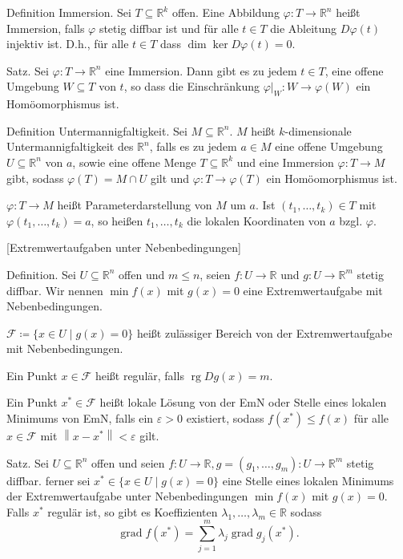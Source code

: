 \documentclass[fleqn,draft,a5paper]{article}
\providecommand{\norm}[1]{\left\lVert#1\right\rVert}
\theoremstyle{remark}
\DeclareMathOperator{\rg}{rg}
\DeclareMathOperator{\grad}{grad}
\begin{document}
Definition Immersion.  Sei \(T \subseteq \mathbb{R}^{k}\) offen.  Eine Abbildung \(\varphi\colon T
\to \mathbb{R}^{n}\) heißt Immersion, falls \(\varphi\) stetig diffbar ist und für alle \(t
\in T\) die Ableitung \(D\varphi(t)\) injektiv ist.  D.h., für alle \(t \in T\) dass
\(\dim \ker D\varphi(t) = 0\).

Satz.  Sei \(\varphi\colon T \to \mathbb{R}^{n}\) eine Immersion.  Dann gibt es zu jedem \(t \in
T\), eine offene Umgebung \(W \subseteq T\) von \(t\), so dass die Einschränkung
\(\varphi\vert_{W}\colon W \to \varphi(W)\) ein Homöomorphismus ist.

Definition Untermannigfaltigkeit.  Sei \(M \subseteq \mathbb{R}^{n}\).  \(M\) heißt
\(k\)-dimensionale Untermannigfaltigkeit des \(\mathbb{R}^{n}\), falls es zu jedem
\(a \in M\) eine offene Umgebung \(U \subseteq \mathbb{R}^{n}\) von \(a\), sowie eine offene
Menge \(T \subseteq \mathbb{R}^{k}\) und eine Immersion \(\varphi\colon T \to M\) gibt, sodass \(\varphi(T) =
M \cap U\) gilt und \(\varphi\colon T \to \varphi(T)\) ein Homöomorphismus ist.

\(\varphi\colon T \to M\) heißt Parameterdarstellung von \(M\) um \(a\).  Ist \((t_{1}, \ldots,
t_{k}) \in T\) mit \(\varphi(t_{1}, \ldots, t_{k}) = a\), so heißen \(t_{1}, \ldots, t_{k}\)
die lokalen Koordinaten von \(a\) bzgl. \(\varphi\).

[Extremwertaufgaben unter Nebenbedingungen]

Definition.  Sei \(U \subseteq \mathbb{R}^{n}\) offen und \(m \le n\), seien \(f\colon U \to \mathbb{R}\) und
\(g\colon U \to \mathbb{R}^{m}\) stetig diffbar.  Wir nennen \(\min f(x)\) mit \(g(x) = 0\)
eine Extremwertaufgabe mit Nebenbedingungen.

\(\mathcal{F} \coloneq \{x \in U \mid g(x) = 0\}\) heißt zulässiger Bereich von der
Extremwertaufgabe mit Nebenbedingungen.

Ein Punkt \(x \in \mathcal{F}\) heißt regulär, falls \(\rg Dg(x) = m\).

Ein Punkt \(x^{\ast} \in \mathcal{F}\) heißt lokale Lösung von der EmN oder Stelle
eines lokalen Minimums von EmN, falls ein \(\varepsilon > 0\) existiert, sodass
\(f(x^{\ast}) \le f(x)\) für alle \(x \in \mathcal{F}\) mit \(\norm{x - x^{\ast}} < \varepsilon\) gilt.

Satz.    Sei \(U \subseteq \mathbb{R}^{n}\) offen und seien \(f\colon U \to \mathbb{R}, g = (g_{1}, \ldots,
g_{m})\colon U \to \mathbb{R}^{m}\) stetig diffbar.  ferner sei \(x^{\ast} \in \{x \in U \mid g(x)
= 0\}\) eine Stelle eines lokalen Minimums der Extremwertaufgabe unter
Nebenbedingungen \(\min f(x)\) mit \(g(x) = 0\).  Falls \(x^{\ast}\) regulär
ist, so gibt es Koeffizienten \(\lambda_{1}, \ldots, \lambda_{m} \in \mathbb{R}\) sodass
\[\grad f(x^{\ast}) = \sum_{j=1}^{m}\lambda_{j} \grad g_{j}(x^{\ast}).\]
\end{document}
